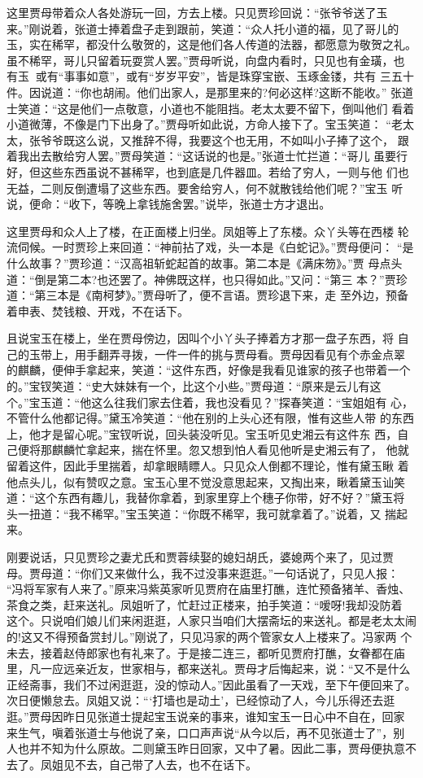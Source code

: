 这里贾母带着众人各处游玩一回，方去上楼。只见贾珍回说：“张爷爷送了玉
来。”刚说着，张道士捧着盘子走到跟前，笑道：“众人托小道的福，见了哥儿的
玉，实在稀罕，都没什么敬贺的，这是他们各人传道的法器，都愿意为敬贺之礼。
虽不稀罕，哥儿只留着玩耍赏人罢。”贾母听说，向盘内看时，只见也有金璜，也
有玉，或有“事事如意”，或有“岁岁平安”，皆是珠穿宝嵌、玉琢金镂，共有
三五十件。因说道：“你也胡闹。他们出家人，是那里来的?何必这样?这断不能收。”
张道士笑道：“这是他们一点敬意，小道也不能阻挡。老太太要不留下，倒叫他们
看着小道微薄，不像是门下出身了。”贾母听如此说，方命人接下了。宝玉笑道：
“老太太，张爷爷既这么说，又推辞不得，我要这个也无用，不如叫小子捧了这个，
跟着我出去散给穷人罢。”贾母笑道：“这话说的也是。”张道士忙拦道：“哥儿
虽要行好，但这些东西虽说不甚稀罕，也到底是几件器皿。若给了穷人，一则与他
们也无益，二则反倒遭塌了这些东西。要舍给穷人，何不就散钱给他们呢？”宝玉
听说，便命：“收下，等晚上拿钱施舍罢。”说毕，张道士方才退出。

这里贾母和众人上了楼，在正面楼上归坐。凤姐等上了东楼。众丫头等在西楼
轮流伺候。一时贾珍上来回道：“神前拈了戏，头一本是《白蛇记》。”贾母便问：
“是什么故事？”贾珍道：“汉高祖斩蛇起首的故事。第二本是《满床笏》。”贾
母点头道：“倒是第二本?也还罢了。神佛既这样，也只得如此。”又问：“第三
本？”贾珍道：“第三本是《南柯梦》。”贾母听了，便不言语。贾珍退下来，走
至外边，预备着申表、焚钱粮、开戏，不在话下。

且说宝玉在楼上，坐在贾母傍边，因叫个小丫头子捧着方才那一盘子东西，将
自己的玉带上，用手翻弄寻拨，一件一件的挑与贾母看。贾母因看见有个赤金点翠
的麒麟，便伸手拿起来，笑道：“这件东西，好像是我看见谁家的孩子也带着一个
的。”宝钗笑道：“史大妹妹有一个，比这个小些。”贾母道：“原来是云儿有这
个。”宝玉道：“他这么往我们家去住着，我也没看见？”探春笑道：“宝姐姐有
心，不管什么他都记得。”黛玉冷笑道：“他在别的上头心还有限，惟有这些人带
的东西上，他才是留心呢。”宝钗听说，回头装没听见。宝玉听见史湘云有这件东
西，自己便将那麒麟忙拿起来，揣在怀里。忽又想到怕人看见他听是史湘云有了，
他就留着这件，因此手里揣着，却拿眼睛瞟人。只见众人倒都不理论，惟有黛玉瞅
着他点头儿，似有赞叹之意。宝玉心里不觉没意思起来，又掏出来，瞅着黛玉讪笑
道：“这个东西有趣儿，我替你拿着，到家里穿上个穗子你带，好不好？”黛玉将
头一扭道：“我不稀罕。”宝玉笑道：“你既不稀罕，我可就拿着了。”说着，又
揣起来。

刚要说话，只见贾珍之妻尤氏和贾蓉续娶的媳妇胡氏，婆媳两个来了，见过贾
母。贾母道：“你们又来做什么，我不过没事来逛逛。”一句话说了，只见人报：
“冯将军家有人来了。”原来冯紫英家听见贾府在庙里打醮，连忙预备猪羊、香烛、
茶食之类，赶来送礼。凤姐听了，忙赶过正楼来，拍手笑道：“嗳呀!我却没防着
这个。只说咱们娘儿们来闲逛逛，人家只当咱们大摆斋坛的来送礼。都是老太太闹
的!这又不得预备赏封儿。”刚说了，只见冯家的两个管家女人上楼来了。冯家两
个未去，接着赵侍郎家也有礼来了。于是接二连三，都听见贾府打醮，女眷都在庙
里，凡一应远亲近友，世家相与，都来送礼。贾母才后悔起来，说：“又不是什么
正经斋事，我们不过闲逛逛，没的惊动人。”因此虽看了一天戏，至下午便回来了。
次日便懒怠去。凤姐又说：“‘打墙也是动土’，已经惊动了人，今儿乐得还去逛
逛。”贾母因昨日见张道士提起宝玉说亲的事来，谁知宝玉一日心中不自在，回家
来生气，嗔着张道士与他说了亲，口口声声说“从今以后，再不见张道士了”，别
人也并不知为什么原故。二则黛玉昨日回家，又中了暑。因此二事，贾母便执意不
去了。凤姐见不去，自己带了人去，也不在话下。

